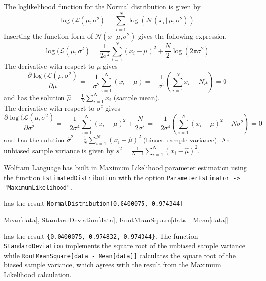 \documentclass{tstextbook}
\begin{document}
\begin{example}
The loglikelihood function for the Normal distribution is given by
  \begin{equation}
    \log(\mathcal{L}(\mu,\sigma^2) = \sum_{i=1}^N \log\left(\mathcal{N}\left(x_i\,\vert\, \mu,\sigma^2\right)\right)
  \end{equation}
Inserting the function form of $\mathcal{N}\left(x\,\vert\, \mu,\sigma^2\right)$ gives the following expression
  \begin{equation}
    \log(\mathcal{L}(\mu,\sigma^2) = \frac{1}{2\sigma^2}\sum_{i=1}^N \left(x_i-\mu\right)^2+\frac{N}{2}\log\left(2\pi\sigma^2\right)
  \end{equation}   
The derivative with respect to $\mu$ gives
  \begin{equation}
    \frac{\partial\log(\mathcal{L}(\mu,\sigma^2)}{\partial\mu} = -\frac{1}{\sigma^2}\sum_{i=1}^N \left(x_i-\mu\right)= -\frac{1}{\sigma^2}\left(\sum_{i=1}^N x_i - N\mu\right)=0
  \end{equation}
and has the solution $\hat{\mu}=\frac{1}{N}\sum_{i=1}^N x_i$ (sample mean).\\

The derivative with respect to $\sigma^2$ gives
  \begin{equation}
    \frac{\partial\log(\mathcal{L}(\mu,\sigma^2)}{\partial\sigma^2} = -\frac{1}{2\sigma^4}\sum_{i=1}^N \left(x_i-\mu\right)^2 + \frac{N}{2\sigma^2}=-\frac{1}{2\sigma^4}\left(\sum_{i=1}^N \left(x_i-\mu\right)^2 - N\sigma^2\right)=0
  \end{equation}
and has the solution $\hat{\sigma}^2=\frac{1}{N}\sum_{i=1}^N \left(x_i-\hat{\mu}\right)^2$ (biased sample variance). An unbiased sample variance is given by $s^2=\frac{1}{N-1}\sum_{i=1}^N \left(x_i-\hat{\mu}\right)^2$.
 
\end{example} 

Wolfram Language has built in Maximum Likelihood parameter estimation using the function \texttt{EstimatedDistribution} with the option \texttt{ParameterEstimator -> "MaximumLikelihood"}.

\begin{mathematica}
data = RandomVariate[NormalDistribution[0, 1], 1000];
dist = EstimatedDistribution[data, NormalDistribution[\[Mu], \[Sigma]],
                             ParameterEstimator -> "MaximumLikelihood"]
\end{mathematica}
has the result \texttt{NormalDistribution[0.0400075, 0.974344]}.
\begin{mathematica}
{Mean[data], StandardDeviation[data], RootMeanSquare[data - Mean[data]]}
\end{mathematica}
has the result \texttt{\{0.0400075, 0.974832, 0.974344\}}. The function 
\texttt{StandardDeviation} implements the square root of the unbiased sample variance, while \texttt{RootMeanSquare[data - Mean[data]]} calculates the square root of the biased sample variance, which agrees with the result from the Maximum Likelihood calculation.\\
\end{document}
